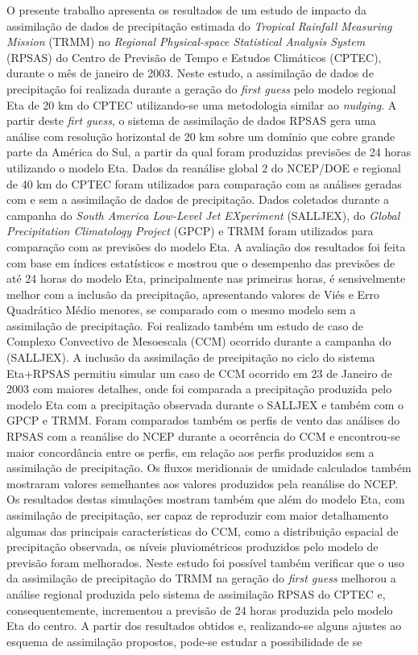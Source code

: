 \begin{resumo}
\hypertarget{estilo:abstract}{}

O presente trabalho apresenta os resultados de um estudo de impacto da assimilação de dados de precipitação estimada do \textit{Tropical Rainfall Measuring Mission} (TRMM) no \textit{Regional Physical-space Statistical Analysis System} (RPSAS) do Centro de Previsão de Tempo e Estudos Climáticos (CPTEC), durante  o mês de janeiro de 2003. Neste estudo, a assimilação de dados de precipitação foi realizada durante a geração do \textit{first guess} pelo modelo regional Eta de 20 km do CPTEC utilizando-se uma metodologia similar ao \textit{nudging}. A partir deste \textit{firt guess}, o sistema de assimilação de dados RPSAS gera uma análise com resolução horizontal de 20 km sobre um domínio que cobre grande parte da América do Sul, a partir da qual foram produzidas previsões de 24 horas utilizando o modelo Eta. Dados da reanálise global 2 do NCEP/DOE e regional de 40 km do CPTEC foram utilizados para comparação com as análises geradas com e sem a assimilação de dados de precipitação. Dados coletados durante a campanha do \textit{South America Low-Level Jet EXperiment} (SALLJEX), do \textit{Global Precipitation Climatology Project} (GPCP) e TRMM foram utilizados para comparação com as previsões do modelo Eta. A avaliação dos resultados foi feita com base em índices estatísticos e mostrou que o desempenho das previsões de até 24 horas do modelo Eta, principalmente nas primeiras horas, é sensivelmente melhor com a inclusão da precipitação, apresentando valores de Viés e Erro Quadrático Médio menores, se comparado com o mesmo modelo sem a assimilação de precipitação. Foi realizado também um estudo de caso de Complexo Convectivo de Mesoescala (CCM) ocorrido durante a campanha do (SALLJEX). A inclusão da assimilação de precipitação no ciclo do sistema Eta+RPSAS permitiu simular um caso de CCM ocorrido em 23 de Janeiro de 2003 com maiores detalhes, onde foi comparada a precipitação produzida pelo modelo Eta com a precipitação observada durante o SALLJEX e também com o GPCP e TRMM. Foram comparados também os perfis de vento das análises do RPSAS com a reanálise do NCEP durante a ocorrência do CCM e encontrou-se maior concordância entre os perfis, em relação aos perfis produzidos sem a assimilação de precipitação. Os fluxos meridionais de umidade calculados também mostraram valores semelhantes aos valores produzidos pela reanálise do NCEP. Os resultados destas simulações mostram também que além do modelo Eta, com assimilação de precipitação, ser capaz de reproduzir com maior detalhamento algumas das principais características do CCM, como a distribuição espacial de precipitação observada, os níveis pluviométricos produzidos pelo modelo de previsão foram melhorados. Neste estudo foi possível também verificar que o uso da assimilação de precipitação do TRMM na geração do \textit{first guess} melhorou a análise regional produzida pelo sistema de assimilação RPSAS do CPTEC e, consequentemente, incrementou a previsão de 24 horas produzida pelo modelo Eta do centro. A partir dos resultados obtidos e, realizando-se alguns ajustes ao esquema de assimilação propostos, pode-se estudar a possibilidade de se 
\end{resumo}
